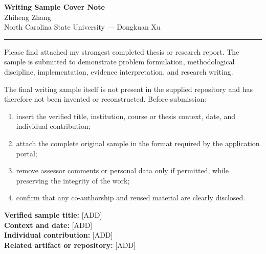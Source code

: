 \documentclass[11pt]{article}
\newcommand{\ApplicantName}{Zhiheng Zhang}
\begin{document}
\begin{center}
{\LARGE\bfseries Writing Sample Cover Note}\\[0.25em]
{\large \ApplicantName}\\
North Carolina State University --- Dongkuan Xu
\end{center}
\vspace{0.35em}\hrule\vspace{0.65em}

Please find attached my strongest completed thesis or research report. The sample is submitted to demonstrate problem formulation, methodological discipline, implementation, evidence interpretation, and research writing.

The final writing sample itself is not present in the supplied repository and has therefore not been invented or reconstructed. Before submission:
\begin{enumerate}
\item insert the verified title, institution, course or thesis context, date, and individual contribution;
\item attach the complete original sample in the format required by the application portal;
\item remove assessor comments or personal data only if permitted, while preserving the integrity of the work;
\item confirm that any co-authorship and reused material are clearly disclosed.
\end{enumerate}

\textbf{Verified sample title:} [ADD]\\
\textbf{Context and date:} [ADD]\\
\textbf{Individual contribution:} [ADD]\\
\textbf{Related artifact or repository:} [ADD]
\end{document}
